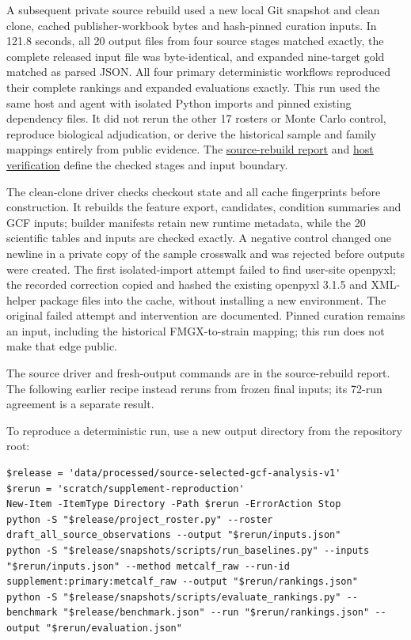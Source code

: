 \documentclass[
  10pt,
  a4paper,
]{article}
\begin{document}
A subsequent private source rebuild used a new local Git snapshot and clean clone, cached publisher-workbook bytes and hash-pinned curation inputs. In 121.8 seconds, all 20 output files from four source stages matched exactly, the complete released input file was byte-identical, and expanded nine-target gold matched as parsed JSON. All four primary deterministic workflows reproduced their complete rankings and expanded evaluations exactly. This run used the same host and agent with isolated Python imports and pinned existing dependency files. It did not rerun the other 17 rosters or Monte Carlo control, reproduce biological adjudication, or derive the historical sample and family mappings entirely from public evidence. The \href{https://github.com/vinvomero/fungallink-benchmark/blob/main/docs/release/clean-source-reproduction-2026-10-07.md}{source-rebuild report} and \href{https://github.com/vinvomero/fungallink-benchmark/blob/main/data/processed/clean-source-reproduction-2026-10-07/host-verification.json}{host verification} define the checked stages and input boundary.

The clean-clone driver checks checkout state and all cache fingerprints before construction. It rebuilds the feature export, candidates, condition summaries and GCF inputs; builder manifests retain new runtime metadata, while the 20 scientific tables and inputs are checked exactly. A negative control changed one newline in a private copy of the sample crosswalk and was rejected before outputs were created. The first isolated-import attempt failed to find user-site openpyxl; the recorded correction copied and hashed the existing openpyxl 3.1.5 and XML-helper package files into the cache, without installing a new environment. The original failed attempt and intervention are documented. Pinned curation remains an input, including the historical FMGX-to-strain mapping; this run does not make that edge public.

The source driver and fresh-output commands are in the source-rebuild report. The following earlier recipe instead reruns from frozen final inputs; its 72-run agreement is a separate result.

To reproduce a deterministic run, use a new output directory from the repository root:

\begin{Verbatim}[breaklines=true,fontsize=\footnotesize]
$release = 'data/processed/source-selected-gcf-analysis-v1'
$rerun = 'scratch/supplement-reproduction'
New-Item -ItemType Directory -Path $rerun -ErrorAction Stop
python -S "$release/project_roster.py" --roster draft_all_source_observations --output "$rerun/inputs.json"
python -S "$release/snapshots/scripts/run_baselines.py" --inputs "$rerun/inputs.json" --method metcalf_raw --run-id supplement:primary:metcalf_raw --output "$rerun/rankings.json"
python -S "$release/snapshots/scripts/evaluate_rankings.py" --benchmark "$release/benchmark.json" --run "$rerun/rankings.json" --output "$rerun/evaluation.json"
\end{Verbatim}
\end{document}
